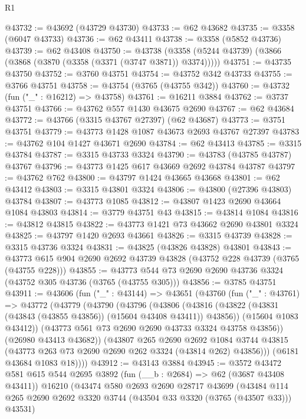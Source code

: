 \begin{lexlean}{R1}
\begin{coremodule}
@43732 := @43692 (@43729 @43730)
@43733 := @62 @43682
@43735 := @3358 (@6047 @43733)
@43736 := @62 @43411
@43738 := @3358 (@5852 @43736)
@43739 := @62 @43408
@43750 := @43738 (@3358 (@5244 @43739) (@3866 (@3868 (@3870 (@3358 (@3371 (@3747 @3871)) @3374)))))
@43751 := @43735 @43750
@43752 := @3760 @43751
@43754 := @43752 @342 @43733
@43755 := @3766 @43751
@43758 := @43754 (@3765 (@43755 @342))
@43760 := @43732 (fun ("_" : @16212) => @43758)
@43761 := @16211 @3884
@43762 := @3737 @43751
@43766 := @43762 @557 @1430 @43675 @2690
@43767 := @62 @43684
@43772 := @43766 (@3315 @43767 @27397) (@62 @43687)
@43773 := @3751 @43751
@43779 := @43773 @1428 @1087 @43673 @2693 @43767 @27397
@43783 := @43762 @104 @1427 @43671 @2690
@43784 := @62 @43413
@43785 := @3315 @43784
@43787 := @3315 @43733 @3324
@43790 := @43783 (@43785 @43787) @43767
@43796 := @43773 @1425 @617 @43669 @2692 @43784 @43787
@43797 := @43762 @762
@43800 := @43797 @1424 @43665 @43668
@43801 := @62 @43412
@43803 := @3315 @43801 @3324
@43806 := @43800 (@27396 @43803) @43784
@43807 := @43773 @1085
@43812 := @43807 @1423 @2690 @43664 @1084 @43803
@43814 := @3779 @43751 @43
@43815 := @43814 @1084
@43816 := @43812 @43815
@43822 := @43773 @1421 @73 @43662 @2690 @43801 @3324
@43825 := @43797 @1420 @2693 @43661
@43826 := @3315 @43739
@43828 := @3315 @43736 @3324
@43831 := @43825 (@43826 @43828) @43801
@43843 := @43773 @615 @904 @2690 @2692 @43739 @43828 (@43752 @228 @43739 (@3765 (@43755 @228)))
@43855 := @43773 @544 @73 @2690 @2690 @43736 @3324 (@43752 @305 @43736 (@3765 (@43755 @305)))
@43856 := @3785 @43751
@43911 := @43606
    (fun ("_" : @43144) =>
    @43651
      (@43760
        (fun ("_" : @43761) =>
        @43772
          (@43779
            (@43790
              (@43796
                (@43806
                  (@43816 (@43822 (@43831 (@43843 (@43855 @43856)) (@15604 @43408 @43411)) @43856))
                  (@15604 @1083 @43412))
                (@43773 @561 @73 @2690 @2690 @43733 @3324 @43758 @43856))
              (@26980 @43413 @43682))
            (@43807
              @265
              @2690
              @2692
              @1084
              @3744
              @43815
              (@43773 @263 @73 @2690 @2690 @262 @3324 (@43814 @262) @43856)))
          (@6181 @43684 @1083 @18))))
@43912 := @43143 @3884
@43945 := @3572
    @43472
    @581
    @615
    @544
    @2695
    @3892
    (fun (__b : @2684) => @62 (@3687 @43408 @43411))
    @16210
    (@43474
      @580
      @2693
      @2690
      @28717
      @43699
      (@43484 @114 @265 @2690 @2692 @3320 @3744 (@43504 @33 @3320 (@3765 (@43507 @33))) @43531)

\end{coremodule}
\end{lexlean}
